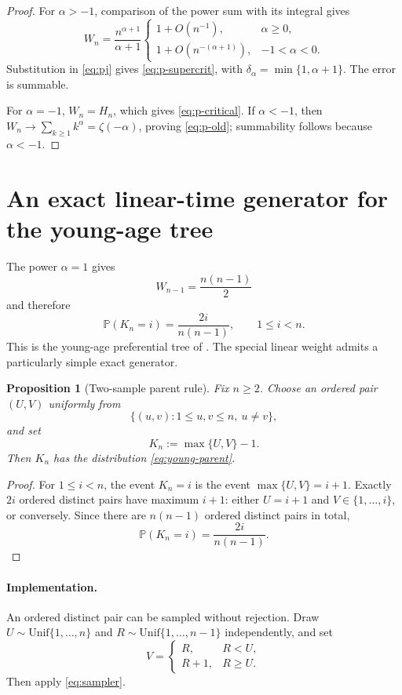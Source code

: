 \documentclass[11pt,a4paper]{article}
\newtheorem{proposition}[theorem]{Proposition}
\newcommand{\Pp}{\mathbb{P}}
\newcommand{\1}{\mathbf{1}}
\begin{document}
\begin{proof}
For $\alpha>-1$, comparison of the power sum with its integral gives
\[
W_n=\frac{n^{\alpha+1}}{\alpha+1}
\begin{cases}
1+O(n^{-1}),&\alpha\ge0,\\
1+O(n^{-(\alpha+1)}),&-1<\alpha<0.
\end{cases}
\]
Substitution in \eqref{eq:pj} gives \eqref{eq:p-supercrit}, with
$\delta_\alpha=\min\{1,\alpha+1\}$.  The error is summable.

For $\alpha=-1$, $W_n=H_n$, which gives \eqref{eq:p-critical}.
If $\alpha<-1$, then
$W_n\to\sum_{k\ge1}k^\alpha=\zeta(-\alpha)$, proving
\eqref{eq:p-old}; summability follows because $\alpha<-1$.
\end{proof}

\section{An exact linear-time generator for the young-age tree}
\label{sec:sampling}

The power $\alpha=1$ gives
\[
W_{n-1}=\frac{n(n-1)}2
\]
and therefore
\begin{equation}\label{eq:young-parent}
\Pp(K_n=i)=\frac{2i}{n(n-1)},
\qquad 1\le i<n.
\end{equation}
This is the young-age preferential tree of
\citet{LyonMahmoud2020}.  The special linear weight admits a particularly
simple exact generator.

\begin{proposition}[Two-sample parent rule]\label{prop:sampler}
Fix $n\ge2$.  Choose an ordered pair $(U,V)$ uniformly from
\[
\{(u,v):1\le u,v\le n,\ u\ne v\},
\]
and set
\begin{equation}\label{eq:sampler}
K_n:=\max\{U,V\}-1.
\end{equation}
Then $K_n$ has the distribution \eqref{eq:young-parent}.
\end{proposition}

\begin{proof}
For $1\le i<n$, the event $K_n=i$ is the event
$\max\{U,V\}=i+1$.  Exactly $2i$ ordered distinct pairs have maximum $i+1$:
either $U=i+1$ and $V\in\{1,\ldots,i\}$, or conversely.  Since there are
$n(n-1)$ ordered distinct pairs in total,
\[
\Pp(K_n=i)=\frac{2i}{n(n-1)}.
\]
\end{proof}

\paragraph{Implementation.}
An ordered distinct pair can be sampled without rejection.  Draw
$U\sim\mathrm{Unif}\{1,\ldots,n\}$ and
$R\sim\mathrm{Unif}\{1,\ldots,n-1\}$ independently, and set
\[
V=
\begin{cases}
R,&R<U,\\
R+1,&R\ge U.
\end{cases}
\]
Then apply \eqref{eq:sampler}.
\end{document}
